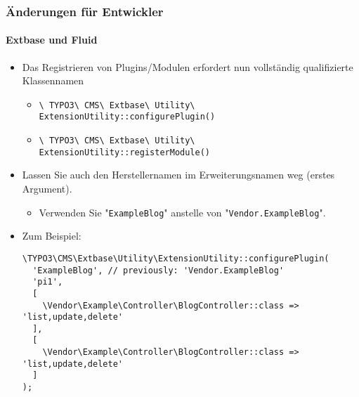 
\begin{frame}[fragile]
	\frametitle{Änderungen für Entwickler}
	\framesubtitle{Extbase und Fluid}

	\lstset{basicstyle=\tiny\ttfamily}

	\begin{itemize}
		\item Das Registrieren von Plugins/Modulen erfordert nun vollständig qualifizierte Klassennamen

			\begin{itemize}\smaller
				\item \texttt{\textbackslash
					TYPO3\textbackslash
					CMS\textbackslash
					Extbase\textbackslash
					Utility\textbackslash
					ExtensionUtility::configurePlugin()}
				\item \texttt{\textbackslash
					TYPO3\textbackslash
					CMS\textbackslash
					Extbase\textbackslash
					Utility\textbackslash
					ExtensionUtility::registerModule()}
			\end{itemize}\normalsize

		\item Lassen Sie auch den Herstellernamen im Erweiterungsnamen weg (erstes Argument).

			\begin{itemize}\smaller
				\item[\ding{228}] Verwenden Sie "\texttt{ExampleBlog}" anstelle von "\texttt{Vendor.ExampleBlog}".
			\end{itemize}

		\item Zum Beispiel:

\begin{lstlisting}
\TYPO3\CMS\Extbase\Utility\ExtensionUtility::configurePlugin(
  'ExampleBlog', // previously: 'Vendor.ExampleBlog'
  'pi1',
  [
    \Vendor\Example\Controller\BlogController::class => 'list,update,delete'
  ],
  [
    \Vendor\Example\Controller\BlogController::class => 'list,update,delete'
  ]
);
\end{lstlisting}

	\end{itemize}

\end{frame}


